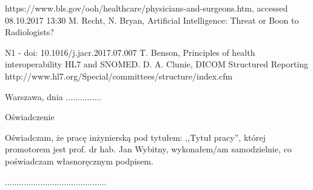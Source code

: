 \documentclass[12pt, twoside, openany]{report}
\theoremstyle{definition}
\begin{document}
\begin{thebibliography}{11}
 https://www.bls.gov/ooh/healthcare/physicians-and-surgeons.htm, accessed 08.10.2017 13:30
 M. Recht, N. Bryan, Artificial Intelligence: Threat or Boon to Radiologists?

N1  - doi: 10.1016/j.jacr.2017.07.007
 T. Benson, Principles of health interoperability HL7 and SNOMED.
 D. A. Clunie, DICOM Structured Reporting
 http://www.hl7.org/Special/committees/structure/index.cfm 
\end{thebibliography}
\tableofcontents
\clearpage
\begin{otherlanguage}{polish}
\pagestyle{empty}
\noindent Warszawa, dnia ...............
\vspace{5cm}
\begin{center}
\LARGE{Oświadczenie}
\end{center}
Oświadczam, że pracę inżynierską pod tytułem: ,,Tytuł pracy'', której promotorem jest prof. dr hab. Jan Wybitny, wykonałem/am samodzielnie, co poświadczam własnoręcznym podpisem.
\vspace{2cm}
\begin{flushright}
...........................................
\end{flushright}
\end{otherlanguage}
\end{document}
